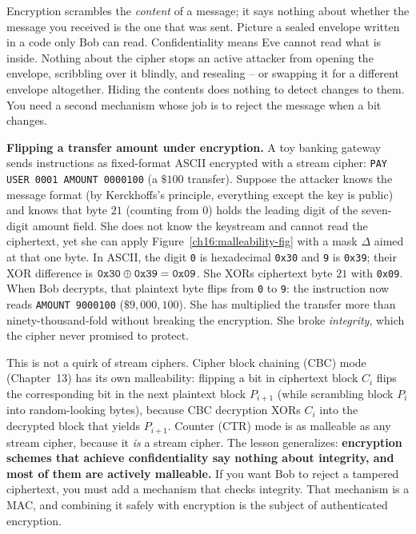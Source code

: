 \begin{intuitionbox}
Encryption scrambles the \emph{content} of a message; it says nothing about whether the message you received is the one that was sent. Picture a sealed envelope written in a code only Bob can read. Confidentiality means Eve cannot read what is inside. Nothing about the cipher stops an active attacker from opening the envelope, scribbling over it blindly, and resealing -- or swapping it for a different envelope altogether. Hiding the contents does nothing to detect changes to them. You need a second mechanism whose job is to reject the message when a bit changes.
\end{intuitionbox}

\begin{attackbox}
\textbf{Flipping a transfer amount under encryption.} A toy banking gateway sends instructions as fixed-format ASCII encrypted with a stream cipher: \texttt{PAY USER 0001 AMOUNT 0000100} (a $\$100$ transfer). Suppose the attacker knows the message format (by Kerckhoffs's principle, everything except the key is public) and knows that byte $21$ (counting from $0$) holds the leading digit of the seven-digit amount field. She does not know the keystream and cannot read the ciphertext, yet she can apply Figure~\ref{ch16:malleability-fig} with a mask $\Delta$ aimed at that one byte. In ASCII, the digit \texttt{0} is hexadecimal \texttt{0x30} and \texttt{9} is \texttt{0x39}; their XOR difference is $\texttt{0x30} \oplus \texttt{0x39} = \texttt{0x09}$. She XORs ciphertext byte $21$ with \texttt{0x09}. When Bob decrypts, that plaintext byte flips from \texttt{0} to \texttt{9}: the instruction now reads \texttt{AMOUNT 9000100} ($\$9{,}000{,}100$). She has multiplied the transfer more than ninety-thousand-fold without breaking the encryption. She broke \emph{integrity}, which the cipher never promised to protect.
\end{attackbox}

This is not a quirk of stream ciphers. Cipher block chaining (CBC) mode (Chapter~13) has its own malleability: flipping a bit in ciphertext block $C_{i}$ flips the corresponding bit in the next plaintext block $P_{i+1}$ (while scrambling block $P_i$ into random-looking bytes), because CBC decryption XORs $C_i$ into the decrypted block that yields $P_{i+1}$. Counter (CTR) mode is as malleable as any stream cipher, because it \emph{is} a stream cipher. The lesson generalizes: \textbf{encryption schemes that achieve confidentiality say nothing about integrity, and most of them are actively malleable.} If you want Bob to reject a tampered ciphertext, you must add a mechanism that checks integrity. That mechanism is a MAC, and combining it safely with encryption is the subject of authenticated encryption.

